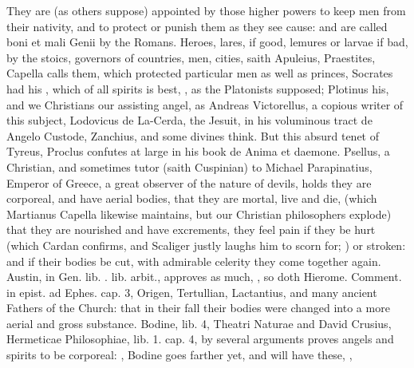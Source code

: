 {{They are (as others suppose) appointed by those higher powers to keep
men from their nativity, and to protect or punish them as they see
cause: and are called boni et mali Genii by the Romans. Heroes, lares,
if good, lemures or larvae if bad, by the stoics, governors of
countries, men, cities, saith Apuleius,  Praestites, Capella calls them,
which protected particular men as well as princes, Socrates had his
, which of all spirits is best, , as the Platonists supposed;
Plotinus his, and we Christians our assisting angel, as Andreas
Victorellus, a copious writer of this subject, Lodovicus de La-Cerda,
the Jesuit, in his voluminous tract de Angelo Custode, Zanchius, and
some divines think. But this absurd tenet of Tyreus, Proclus confutes
at large in his book \textlatin{de Anima et daemone}.
Psellus, a Christian, and sometimes tutor (saith Cuspinian) to
Michael Parapinatius, Emperor of Greece, a great observer of the nature
of devils, holds they are corporeal, and have aerial bodies,
that they are mortal, live and die, (which Martianus Capella likewise
maintains, but our Christian philosophers explode) that they are
nourished and have excrements, they feel pain if they be hurt (which
Cardan confirms, and Scaliger justly laughs him to scorn for;  \etc{}) or stroken: and
if their bodies be cut, with admirable celerity they come together
again. Austin, in Gen. lib. . lib. arbit., approves as much, , so doth
Hierome. Comment. in epist. ad Ephes. cap. 3, Origen, Tertullian,
Lactantius, and many ancient Fathers of the Church: that in their fall
their bodies were changed into a more aerial and gross substance.
Bodine, lib. 4, \textlatin{Theatri Naturae} and David Crusius, \textlatin{Hermeticae
Philosophiae}, lib. 1. cap. 4, by several arguments proves angels and
spirits to be corporeal: ,  Bodine
goes farther yet, and will have these, ,
}}
